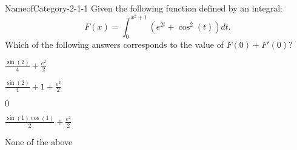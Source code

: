 \documentclass[12pt]{article}
\begin{document}
\begin{quiz}{-5}
    \begin{multi}{NameofCategory-2-1-1}
    Given the following function defined by an integral:$$F(x)= \int_{0}^{x^{2} + 1}\left(e^{2 t} + \cos^{2}{\left(t \right)}\right) dt .$$Which of the following answers corresponds to the value of $F(0)+F'(0)$?
    \item* $\frac{\sin{\left(2 \right)}}{4} + \frac{e^{2}}{2}$
    \item $\frac{\sin{\left(2 \right)}}{4} + 1 + \frac{e^{2}}{2}$
    \item $0$
    \item $\frac{\sin{\left(1 \right)} \cos{\left(1 \right)}}{2} + \frac{e^{2}}{2}$
    \item None of the above
    \end{multi}
    \end{quiz}
    
\end{document}
